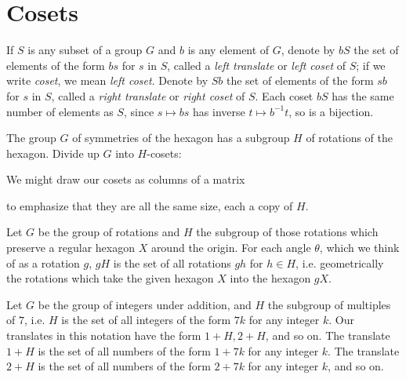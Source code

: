 \section{Cosets}

If \(S\) is any subset of a group \(G\) and \(b\) is any element of \(G\), denote by \(bS\) the set of elements of the form \(bs\) for \(s\) in \(S\), called a \emph{left translate} or \emph{left coset} of \(S\); if we write \emph{coset}, we mean \emph{left coset}.
Denote by \(Sb\) the set of elements of the form \(sb\) for \(s\) in \(S\), called a \emph{right translate} or \emph{right coset} of \(S\).
Each coset \(bS\) has the same number of elements as \(S\), since \(s \mapsto bs\) has inverse \(t \mapsto b^{-1}t\), so is a bijection.

\begin{example}
The group \(G\) of symmetries of the hexagon has a subgroup \(H\) of rotations of the hexagon.
Divide up \(G\) into \(H\)-cosets:
\begin{center}

\end{center}
\end{example}
\begin{example}
We might draw our cosets as columns of a matrix
\begin{center}

\end{center}
to emphasize that they are all the same size, each a copy of \(H\).
\end{example}
\begin{example}
Let \(G\) be the group of rotations and \(H\) the subgroup of those rotations which preserve a regular hexagon \(X\) around the origin.
For each angle \(\theta\), which we think of as a rotation \(g\), \(gH\) is the set of all rotations \(gh\) for \(h \in H\), i.e. geometrically the rotations which take the given hexagon \(X\) into the hexagon \(gX\).
\end{example}
\begin{example}
Let \(G\) be the group of integers under addition, and \(H\) the subgroup of multiples of \(7\), i.e. \(H\) is the set of all integers of the form \(7k\) for any integer \(k\).
Our translates in this notation have the form \(1+H, 2+H\), and so on.
The translate \(1+H\) is the set of all numbers of the form \(1+7k\) for any integer \(k\).
The translate \(2+H\) is the set of all numbers of the form \(2+7k\) for any integer \(k\), and so on.
\end{example}

